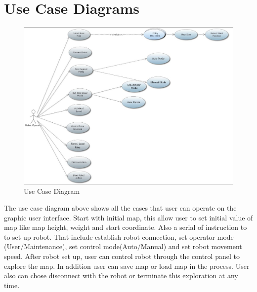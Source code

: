 \documentclass[11pt, a4paper]{report}
\begin{document}
\section{Use Case Diagrams}
\begin{figure}[h]
  \centering
    \includegraphics[width=16cm]{SEP_13_UseCase.jpg}
  \caption{Use Case Diagram}
\end{figure}

The use case diagram above shows all the cases that user can operate on the graphic user interface. Start with initial map, this allow user to set initial value of map like map height, weight and start coordinate. Also a serial of instruction to to set up robot. That include establish robot connection, set operator mode (User/Maintenance), set control mode(Auto/Manual) and set robot movement speed. After robot set up, user can control robot through the control panel to explore the map. In addition user can save map or load map in the process. User also can chose disconnect with the robot or terminate this exploration at any time.
\newpage
\end{document}
